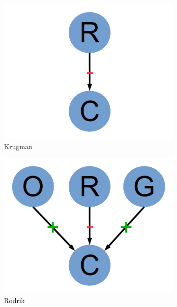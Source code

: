 \documentclass[12pt]{article}
\begin{document}
\begin{figure}
\begin{subfigure}[b]{0.2\textwidth}
                \includegraphics[width=\textwidth]{krugman.pdf}
                \caption{\footnotesize Krugman}
                \label{fig:krugman}
        \end{subfigure}
        \begin{subfigure}[b]{0.2\textwidth}
                \includegraphics[width=\textwidth]{rodrik.pdf}
                \caption{\footnotesize Rodrik}
                \label{fig:rodrik}
        \end{subfigure}
        \begin{subfigure}[b]{0.2\textwidth}

\end{subfigure}
\end{figure}
\end{document}

